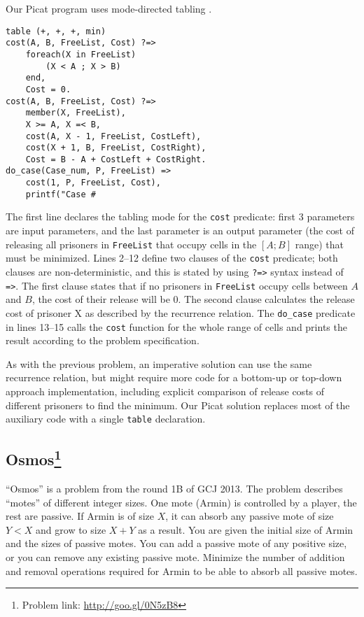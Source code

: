 \documentclass{llncs}
\begin{document}
Our Picat program uses mode-directed tabling \cite{zhou2010mode}.

\begin{lstlisting}[caption={Picat solution for the ``Bribe the Prisoners'' problem}]
table (+, +, +, min)
cost(A, B, FreeList, Cost) ?=>
    foreach(X in FreeList)
        (X < A ; X > B)
    end,
    Cost = 0.
cost(A, B, FreeList, Cost) ?=>
    member(X, FreeList),
    X >= A, X =< B,
    cost(A, X - 1, FreeList, CostLeft),
    cost(X + 1, B, FreeList, CostRight),
    Cost = B - A + CostLeft + CostRight.
do_case(Case_num, P, FreeList) =>
    cost(1, P, FreeList, Cost),
    printf("Case #\end{lstlisting}

The first line declares the tabling mode for the \texttt{cost} predicate: first 3 parameters are input parameters, and the last parameter is an output parameter
(the cost of releasing all prisoners in \texttt{FreeList} that occupy cells in the $[A; B]$ range) that must be minimized.
Lines 2--12 define two clauses of the \texttt{cost} predicate; both clauses are non-deterministic, and this is stated by using \texttt{?=>} syntax instead of \texttt{=>}.
The first clause states that if no prisoners in \texttt{FreeList} occupy cells between $A$ and $B$, the cost of their release will be 0.
The second clause calculates the release cost of prisoner X as described by the recurrence relation.
The \texttt{do\_case} predicate in lines 13--15 calls the \texttt{cost} function for the whole range of cells and prints the result according to the problem specification.

As with the previous problem, an imperative solution can use the same recurrence relation, but might require more code for a bottom-up or top-down approach implementation, including explicit comparison of release costs of different prisoners to find the minimum. Our Picat solution replaces most of the auxiliary code with a single \texttt{table} declaration.

\subsection*{Osmos\footnote{Problem link: \url{http://goo.gl/0N5zB8}}}

``Osmos'' is a problem from the round 1B of GCJ 2013.
The problem describes ``motes'' of different integer sizes. One mote (Armin) is controlled by a player, the rest are passive. If Armin is of size $X$, it can absorb any passive mote of size $Y < X$ and grow to size $X + Y$ as a result. You are given the initial size of Armin and the sizes of passive motes. You can add a passive mote of any positive size, or you can remove any existing passive mote. Minimize the number of addition and removal operations required for Armin to be able to absorb all passive motes.
\end{document}
